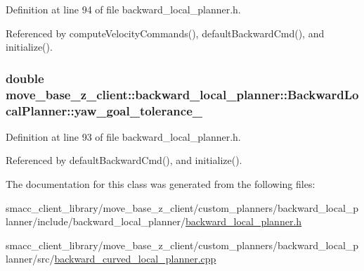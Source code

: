 Definition at line 94 of file backward\+\_\+local\+\_\+planner.\+h.



Referenced by compute\+Velocity\+Commands(), default\+Backward\+Cmd(), and initialize().

\subsubsection[{\texorpdfstring{yaw\+\_\+goal\+\_\+tolerance\+\_\+}{yaw_goal_tolerance_}}]{\setlength{\rightskip}{0pt plus 5cm}double move\+\_\+base\+\_\+z\+\_\+client\+::backward\+\_\+local\+\_\+planner\+::\+Backward\+Local\+Planner\+::yaw\+\_\+goal\+\_\+tolerance\+\_\+\hspace{0.3cm}{\ttfamily [private]}}\hypertarget{classmove__base__z__client_1_1backward__local__planner_1_1BackwardLocalPlanner_a10d15842054d518159baa535afe6f1fd}{}\label{classmove__base__z__client_1_1backward__local__planner_1_1BackwardLocalPlanner_a10d15842054d518159baa535afe6f1fd}


Definition at line 93 of file backward\+\_\+local\+\_\+planner.\+h.



Referenced by default\+Backward\+Cmd(), and initialize().



The documentation for this class was generated from the following files\+:\begin{DoxyCompactItemize}
\item 
smacc\+\_\+client\+\_\+library/move\+\_\+base\+\_\+z\+\_\+client/custom\+\_\+planners/backward\+\_\+local\+\_\+planner/include/backward\+\_\+local\+\_\+planner/\hyperlink{backward__local__planner_8h}{backward\+\_\+local\+\_\+planner.\+h}\item 
smacc\+\_\+client\+\_\+library/move\+\_\+base\+\_\+z\+\_\+client/custom\+\_\+planners/backward\+\_\+local\+\_\+planner/src/\hyperlink{backward__curved__local__planner_8cpp}{backward\+\_\+curved\+\_\+local\+\_\+planner.\+cpp}\end{DoxyCompactItemize}
